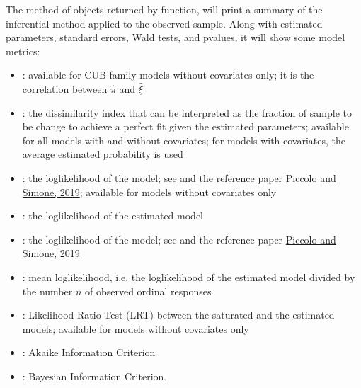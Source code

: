 \documentclass[letterpaper,10pt,english]{sphinxmanual}
\begin{document}
\sphinxAtStartPar
The method  of objects returned by  function, will print a summary
of the inferential method applied to the observed sample. Along with estimated parameters,
standard errors, Wald tests, and p\sphinxhyphen{}values, it will show some model metrics:
\begin{itemize}
\item {} 
\sphinxAtStartPar
{}: available for CUB family models without covariates only; it is the correlation between
\(\hat{\pi}\) and \(\hat{\xi}\)

\item {} 
\sphinxAtStartPar
{}: the dissimilarity index that can be interpreted as the fraction of sample to be
change to achieve a perfect fit given the estimated parameters; available for all models with and
without covariates; for models with covariates, the average estimated probability is used

\item {} 
\sphinxAtStartPar
{}: the log\sphinxhyphen{}likelihood of the  model; see 
and the reference paper
\hyperlink{cite.references:id3}{Piccolo and Simone, 2019}; available for models without covariates only

\item {} 
\sphinxAtStartPar
{}: the log\sphinxhyphen{}likelihood of the estimated model

\item {} 
\sphinxAtStartPar
{}: the log\sphinxhyphen{}likelihood of the  model; see 
and the reference paper
\hyperlink{cite.references:id3}{Piccolo and Simone, 2019}

\item {} 
\sphinxAtStartPar
{}: mean log\sphinxhyphen{}likelihood, i.e. the log\sphinxhyphen{}likelihood of the estimated model divided
by the number \(n\) of observed ordinal responses

\item {} 
\sphinxAtStartPar
{}: Likelihood Ratio Test (LRT) between the saturated and the estimated models; available
for models without covariates only

\item {} 
\sphinxAtStartPar
{}: Akaike Information Criterion

\item {} 
\sphinxAtStartPar
{}: Bayesian Information Criterion.

\end{itemize}
\end{document}
